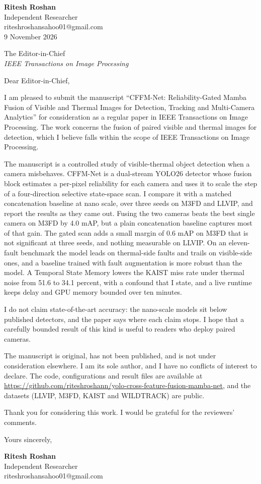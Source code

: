 \documentclass[11pt]{article}
\begin{document}
\raggedright
\textbf{Ritesh Roshan}\\
Independent Researcher\\
riteshroshansahoo01@gmail.com\\
9 November 2026

The Editor-in-Chief\\
\textit{IEEE Transactions on Image Processing}

Dear Editor-in-Chief,

I am pleased to submit the manuscript ``CFFM-Net: Reliability-Gated Mamba Fusion of Visible and Thermal Images for Detection, Tracking and Multi-Camera Analytics'' for consideration as a regular paper in IEEE Transactions on Image Processing. The work concerns the fusion of paired visible and thermal images for detection, which I believe falls within the scope of IEEE Transactions on Image Processing.

The manuscript is a controlled study of visible-thermal object detection when a camera misbehaves. CFFM-Net is a dual-stream YOLO26 detector whose fusion block estimates a per-pixel reliability for each camera and uses it to scale the step of a four-direction selective state-space scan. I compare it with a matched concatenation baseline at nano scale, over three seeds on M3FD and LLVIP, and report the results as they came out. Fusing the two cameras beats the best single camera on M3FD by 4.0 mAP, but a plain concatenation baseline captures most of that gain. The gated scan adds a small margin of 0.6 mAP on M3FD that is not significant at three seeds, and nothing measurable on LLVIP. On an eleven-fault benchmark the model leads on thermal-side faults and trails on visible-side ones, and a baseline trained with fault augmentation is more robust than the model. A Temporal State Memory lowers the KAIST miss rate under thermal noise from 51.6 to 34.1 percent, with a confound that I state, and a live runtime keeps delay and GPU memory bounded over ten minutes.

I do not claim state-of-the-art accuracy: the nano-scale models sit below published detectors, and the paper says where each claim stops. I hope that a carefully bounded result of this kind is useful to readers who deploy paired cameras.

The manuscript is original, has not been published, and is not under consideration elsewhere. I am its sole author, and I have no conflicts of interest to declare. The code, configurations and result files are available at \url{https://github.com/riteshroshann/yolo-cross-feature-fusion-mamba-net}, and the datasets (LLVIP, M3FD, KAIST and WILDTRACK) are public.

Thank you for considering this work. I would be grateful for the reviewers' comments.

Yours sincerely,

\vspace{0.4em}
\textbf{Ritesh Roshan}\\
Independent Researcher\\
riteshroshansahoo01@gmail.com
\end{document}
